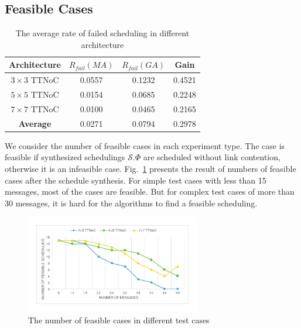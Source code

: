 \documentclass[journal]{IEEEtran}
\newcommand{\calS}{\mathcal{S}}
\theoremstyle{remark}
\begin{document}
\subsection{Feasible Cases}
\begin{table}[!t]
	\renewcommand{\arraystretch}{1.3}
	\caption{The average rate of failed scheduling in different architecture }
	\label{t:performance}
	\centering
	\begin{tabular}{|c||c||c||c|}
		\hline
		\textbf{Architecture} & \textbf{$R_{fail}(MA)$} &\textbf{$R_{fail}(GA)$} & \textbf{Gain}\\
		\hline 
		$3\times 3$ TTNoC&0.0557& 0.1232&	0.4521		
		\\
		\hline
		$5\times 5$ TTNoC& 0.0154	& 0.0685&0.2248\\
		\hline
		$7\times 7$ TTNoC& 0.0100& 	0.0465&	0.2165\\
		\hline		
		\hline
		\textbf{Average}& 	0.0271 &0.0794&0.2978\\
		\hline
	\end{tabular}	
\end{table}
We consider the number of feasible cases in each experiment type.
The case is feasible if synthesized schedulings $\calS.\Phi$ are scheduled without link contention,
 otherwise it is an infeasible case.
Fig.~\ref{f:feasible} presents the result of numbers of feasible cases after the schedule synthesis.
For simple test cases with less than 15 messages,
 most of the cases are feasible.
But for complex test cases of more than 30 messages, it is hard for the algorithms to find a feasible scheduling.
\begin{figure}[!t]
	\centering
	\includegraphics[width=3in]{picture/feasible_case}
	\caption{The number of feasible cases in different test cases}
	\label{f:feasible}
\end{figure}
\end{document}
